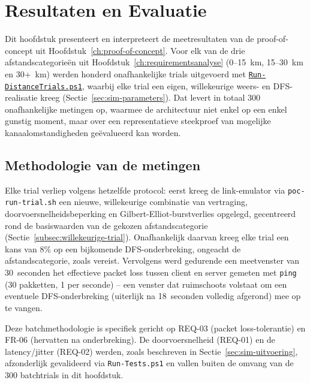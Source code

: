 
\chapter{Resultaten en Evaluatie}%
\label{ch:resultaten-en-evaluatie}

Dit hoofdstuk presenteert en interpreteert de meetresultaten van de proof-of-concept uit
Hoofdstuk~\ref{ch:proof-of-concept}. Voor elk van de drie afstandscategorieën uit
Hoofdstuk~\ref{ch:requirementsanalyse} (0--15~km, 15--30~km en 30+~km) werden honderd
onafhankelijke trials uitgevoerd met \href{code/scripts/Run-DistanceTrials.ps1}{\texttt{Run-DistanceTrials.ps1}},
waarbij elke trial een eigen, willekeurige weers- en DFS-realisatie kreeg
(Sectie~\ref{sec:sim-parameters}). Dat levert in totaal 300 onafhankelijke metingen op,
waarmee de architectuur niet enkel op een enkel gunstig moment, maar over een
representatieve steekproef van mogelijke kanaalomstandigheden geëvalueerd kan worden.

\section{Methodologie van de metingen}%
\label{sec:res-methodologie}

Elke trial verliep volgens hetzelfde protocol: eerst kreeg de link-emulator via
\texttt{poc-run-trial.sh} een nieuwe, willekeurige combinatie van vertraging,
doorvoersnelheidsbeperking en Gilbert-Elliot-burstverlies opgelegd, gecentreerd rond de
basiswaarden van de gekozen afstandscategorie (Sectie~\ref{subsec:willekeurige-trial}).
Onafhankelijk daarvan kreeg elke trial een kans van 8\% op een bijkomende
DFS-onderbreking, ongeacht de afstandscategorie, zoals vereist. Vervolgens werd
gedurende een meetvenster van 30~seconden het effectieve packet loss tussen client en
server gemeten met \texttt{ping} (30 pakketten, 1 per seconde) -- een venster dat
ruimschoots volstaat om een eventuele DFS-onderbreking (uiterlijk na 18~seconden
volledig afgerond) mee op te vangen.

Deze batchmethodologie is specifiek gericht op REQ-03 (packet loss-tolerantie) en FR-06
(hervatten na onderbreking). De doorvoersnelheid (REQ-01) en de latency/jitter (REQ-02)
werden, zoals beschreven in Sectie~\ref{sec:sim-uitvoering}, afzonderlijk gevalideerd via
\texttt{Run-Tests.ps1} en vallen buiten de omvang van de 300 batchtrials in dit
hoofdstuk.

